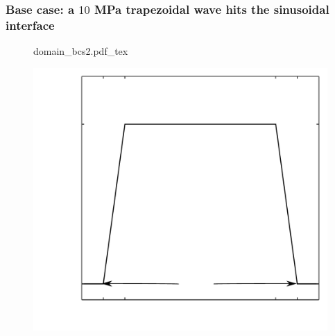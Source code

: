 \begin{frame}\frametitle{\vspace*{0.5cm} Base case: a $10$ MPa trapezoidal wave hits the sinusoidal interface}%
  \hfill%
  \begin{minipage}{0.48\textwidth}
    \begin{figure}
      \centering
      \hfill%
      \def\svgwidth{0.75\textwidth} {\footnotesize
        {domain_bcs2.pdf_tex}%
      }%
      \hfill%
    \end{figure}
  \end{minipage}
  \hfill%
  \begin{minipage}{0.48\textwidth}
    \begin{figure}
      \centering%
      \hfill%
      \includegraphics[width=\textwidth]{../figs/lung_figs/p0_vs_y}%
      \hfill%
    \end{figure}
  \end{minipage}
  \hfill%
\end{frame}
